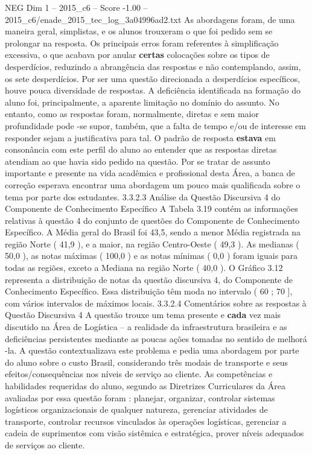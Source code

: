 \begin{textsample}{NEG Dim 1 – 2015\_c6 – Score -1.00 – 2015\_c6/enade\_2015\_tec\_log\_3a04996ad2.txt}
As abordagens foram, de uma maneira geral, simplistas, e os alunos trouxeram o que foi pedido sem se prolongar na resposta.
Os principais erros foram referentes à simplificação excessiva, o que acabava por anular \textbf{certas} colocações sobre os tipos de desperdícios, reduzindo a abrangência das respostas e não contemplando, assim, os sete desperdícios.
Por ser uma questão direcionada a desperdícios específicos, houve pouca diversidade de respostas.
A deficiência identificada na formação do aluno foi, principalmente, a aparente limitação no domínio do assunto.
No entanto, como as respostas foram, normalmente, diretas e sem maior profundidade pode -se supor, também, que a falta de tempo e/ou de interesse em responder sejam a justificativa para tal.
O padrão de resposta \textbf{estava} em consonância com este perfil do aluno ao entender que as respostas diretas atendiam ao que havia sido pedido na questão.
Por se tratar de assunto importante e presente na vida acadêmica e profissional desta Área, a banca de correção esperava encontrar uma abordagem um pouco mais qualificada sobre o tema por parte dos estudantes. 3.3.2.3 Análise da Questão Discursiva 4 do Componente de Conhecimento Específico A Tabela 3.19 contém as informações relativas à questão 4 do conjunto de questões do Componente de Conhecimento Específico.
A Média geral do Brasil foi 43,5, sendo a menor Média registrada na região Norte ( 41,9 ), e a maior, na região Centro-Oeste ( 49,3 ).
As medianas ( 50,0 ), as notas máximas ( 100,0 ) e as notas mínimas ( 0,0 ) foram iguais para todas as regiões, exceto a Mediana na região Norte ( 40,0 ).
O Gráfico 3.12 representa a distribuição de notas da questão discursiva 4, do Componente de Conhecimento Específico.
Essa distribuição têm moda no intervalo ( 60 ; 70 ], com vários intervalos de máximos locais. 3.3.2.4 Comentários sobre as respostas à Questão Discursiva 4 A questão trouxe um tema presente e \textbf{cada} vez mais discutido na Área de Logística – a realidade da infraestrutura brasileira e as deficiências persistentes mediante as poucas ações tomadas no sentido de melhorá -la.
A questão contextualizava este problema e pedia uma abordagem por parte do aluno sobre o custo Brasil, considerando três modais de transporte e seus efeitos/consequências nos níveis de serviço ao cliente.
As competências e habilidades requeridas do aluno, segundo as Diretrizes Curriculares da Área avaliadas por essa questão foram : planejar, organizar, controlar sistemas logísticos organizacionais de qualquer natureza, gerenciar atividades de transporte, controlar recursos vinculados às operações logísticas, gerenciar a cadeia de suprimentos com visão sistêmica e estratégica, prover níveis adequados de serviços ao cliente.

\end{textsample}
